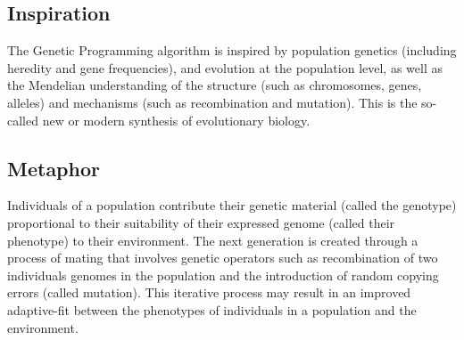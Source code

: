 \subsection{Inspiration}
The Genetic Programming algorithm is inspired by population genetics (including heredity and gene frequencies), and evolution at the population level, as well as the Mendelian understanding of the structure (such as chromosomes, genes, alleles) and mechanisms (such as recombination and mutation). This is the so-called new or modern synthesis of evolutionary biology. 

\subsection{Metaphor}
Individuals of a population contribute their genetic material (called the genotype) proportional to their suitability of their expressed genome (called their phenotype) to their environment. The next generation is created through a process of mating that involves genetic operators such as recombination of two individuals genomes in the population and the introduction of random copying errors (called mutation). This iterative process may result in an improved adaptive-fit between the phenotypes of individuals in a population and the environment.

